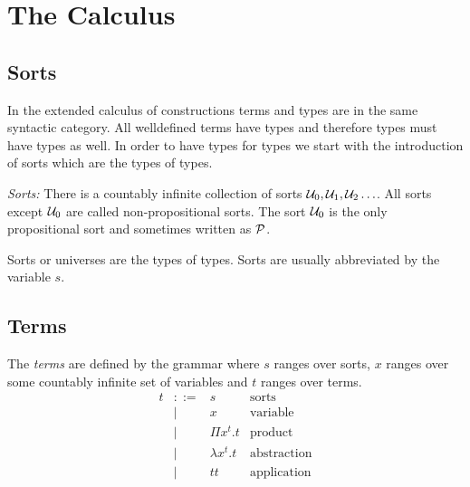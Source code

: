 \section{The Calculus}






\subsection{Sorts}


In the extended calculus of constructions terms and types are in the same
syntactic category. All welldefined terms have types and therefore types must
have types as well. In order to have types for types we start with the
introduction of sorts which are the types of types.

\begin{definition}
    \emph{Sorts:} There is a countably infinite collection of sorts ${\cal U}_0,
    {\cal U}_1, {\cal U}_2 \ldots$. All sorts except ${\cal U}_0$ are called
    non-propositional sorts. The sort ${\cal U}_0$ is the only propositional sort
    and sometimes written as ${\cal P}$.

    Sorts or universes are the types of types. Sorts are usually abbreviated by
    the variable $s$.
\end{definition}





\subsection{Terms}

\begin{definition}
    The \emph{terms} are defined by the grammar where $s$ ranges over sorts, $x$
    ranges over some countably infinite set of variables and $t$ ranges over
    terms.
    $$
    \begin{array}{llll}
        t

        &::=& s & \text{sorts}

        \\

        &\mid & x & \text{variable}

        \\

        &\mid & \Pi x^t. t & \text{product}

        \\

        &\mid & \lambda x^t. t & \text{abstraction}

        \\

        &\mid & t t & \text{application}
    \end{array}
    $$
\end{definition}







